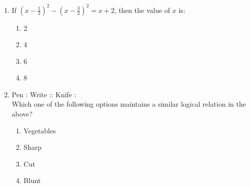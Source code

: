 \documentclass[journal,12pt,onecolumn]{IEEEtran}
\theoremstyle{remark}
\begin{document}
\begin{enumerate}
    \item If $(x- \frac{1}{2})^2-(x- \frac{3}{2})^2=x+2$, then the value of $x$ is:
    \begin{enumerate}
        \item 2
        \item 4
        \item 6
        \item 8
    \end{enumerate}
    \item Pen : Write :: Knife : {\underline{\hspace{2cm}}}\\
    Which one of the following options maintains a similar logical relation in the above?
    \begin{enumerate}
        \item Vegetables
        \item Sharp
        \item Cut
        \item Blunt
    \end{enumerate}
\end{enumerate}
\end{document}
